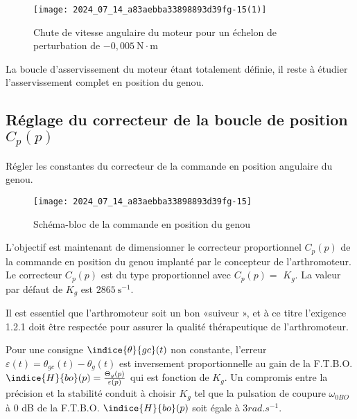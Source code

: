 
\begin{figure}[!h]\centering
\texttt{[image: 2024\_07\_14\_a83aebba33898893d39fg-15(1)]}
\caption{\label{fig:ccs_mp_2024:fig:25}Chute de vitesse angulaire du moteur pour un échelon de perturbation de $-0,005 \mathrm{~N} \cdot \mathrm{m}$}
\end{figure}
La boucle d'asservissement du moteur étant totalement définie, il reste à étudier l'asservissement complet en position du genou.

\subsection{Réglage du correcteur de la boucle de position $C_{p}(p)$}

\begin{obj}
Régler les constantes du correcteur de la commande en position angulaire du genou.
\end{obj}

\begin{figure}[!h]\centering
\texttt{[image: 2024\_07\_14\_a83aebba33898893d39fg-15]}
\caption{\label{fig:ccs_mp_2024:fig:26}Schéma-bloc de la commande en position du genou}
\end{figure}
L'objectif est maintenant de dimensionner le correcteur proportionnel $C_{p}(p)$ de la commande en position du genou implanté par le concepteur de l'arthromoteur. Le correcteur $C_{p}(p)$ est du type proportionnel avec $C_{p}(p)=$ $K_{g}$. La valeur par défaut de $K_{g}$ est $2865 \mathrm{~s}^{-1}$.

Il est essentiel que l'arthromoteur soit un bon «suiveur », et à ce titre l'exigence 1.2.1 doit être respectée pour assurer la qualité thérapeutique de l'arthromoteur.

Pour une consigne $\indice{\theta}{g c}(t)$ non constante, l'erreur $\varepsilon(t)=\theta_{g c}(t)-\theta_{g}(t)$ est inversement proportionnelle au gain de la F.T.B.O. $\indice{H}{bo}(p)=\frac{\Theta_{g}(p)}{\varepsilon(p)}$ qui est fonction de $K_{g}$. Un compromis entre la précision et la stabilité conduit à choisir $K_{g}$ tel que la pulsation de coupure $\omega_{0 B O}$ à 0 dB de la F.T.B.O. $\indice{H}{bo}(p)$ soit égale à $3 \si{rad.s^{-1}}$.

